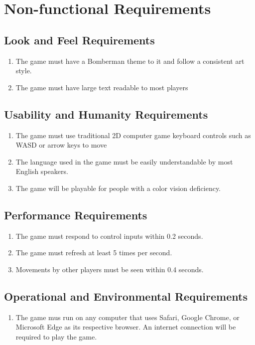 \documentclass[12pt, titlepage]{article}
\begin{document}
\section{Non-functional Requirements}

\subsection{Look and Feel Requirements}

\begin{enumerate}[{LR}1. ]
    \item The game must have a Bomberman theme to it and follow a consistent art style. 
    \item The game must have large text readable to most players
\end{enumerate}



\subsection{Usability and Humanity Requirements}

\begin{enumerate}[{UH}1. ]
    \item The game must use traditional 2D computer game keyboard controls such as WASD or arrow keys to move
    \item The language used in the game must be easily understandable by most English speakers.
    \item The game will be playable for people with a color vision deficiency. 
\end{enumerate}



\subsection{Performance Requirements}

\begin{enumerate}[{PR}1. ]
    \item The game must respond to control inputs within 0.2 seconds.
    \item The game must refresh at least 5 times per second.
    \item Movements by other players must be seen within 0.4 seconds.
\end{enumerate}

\subsection{Operational and Environmental Requirements}
\begin{enumerate}[{OE}1. ]
    \item The game mus run on any computer that uses Safari, Google Chrome, or Microsoft Edge as its respective browser. An internet connection will be required to play the game.
\end{enumerate}
\end{document}
